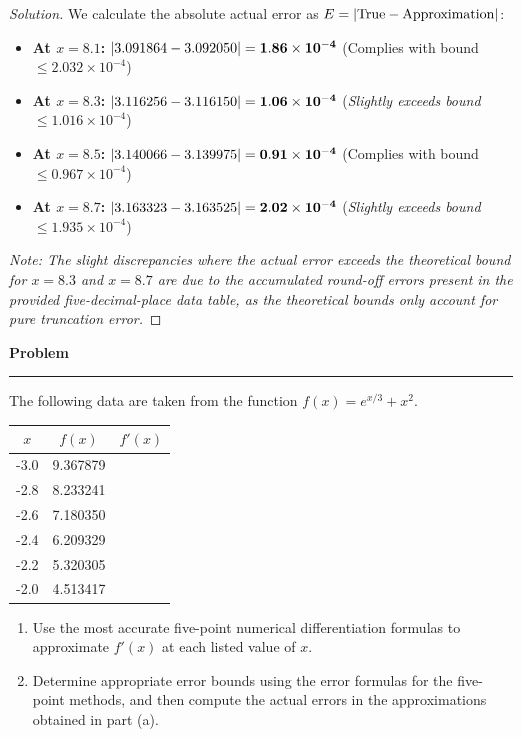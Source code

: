 \documentclass[11pt, a4paper]{article}
\DeclarePairedDelimiter\abs{\lvert}{\rvert}
\newenvironment{problem}{%
  \begin{tcolorbox}[
    colback=blue!4!white,
    colframe=blue!38!black,
    boxrule=0.95pt,
    arc=3pt,
    left=11pt,
    right=11pt,
    top=10pt,
    bottom=11pt,
    before skip=12pt,
    after skip=14pt,
  ]
  \noindent\textbf{\textcolor{blue!35!black}{Problem}}\par\nointerlineskip
  {\color{blue!42!black}\rule{\linewidth}{0.55pt}}\par\vspace{0.55em}%
}{%
  \end{tcolorbox}%
}
\newif\ifsolutionnewpage
\newenvironment{solution}
  {\begin{proof}[Solution]}
  {\end{proof}\ifsolutionnewpage\newpage\fi}
\begin{document}
\begin{solution}
    We calculate the absolute actual error as $E = \abs{\text{True} - \text{Approximation}}$:
    \begin{itemize}
        \item \textbf{At $x = 8.1$:} $\abs{3.091864 - 3.092050} = \mathbf{1.86 \times 10^{-4}}$ (Complies with bound $\le 2.032 \times 10^{-4}$)
        \item \textbf{At $x = 8.3$:} $\abs{3.116256 - 3.116150} = \mathbf{1.06 \times 10^{-4}}$ (\textit{Slightly exceeds bound $\le 1.016 \times 10^{-4}$})
        \item \textbf{At $x = 8.5$:} $\abs{3.140066 - 3.139975} = \mathbf{0.91 \times 10^{-4}}$ (Complies with bound $\le 0.967 \times 10^{-4}$)
        \item \textbf{At $x = 8.7$:} $\abs{3.163323 - 3.163525} = \mathbf{2.02 \times 10^{-4}}$ (\textit{Slightly exceeds bound $\le 1.935 \times 10^{-4}$})
    \end{itemize}
    
    \textit{Note: The slight discrepancies where the actual error exceeds the theoretical bound for $x=8.3$ and $x=8.7$ are due to the accumulated round-off errors present in the provided five-decimal-place data table, as the theoretical bounds only account for pure truncation error.}
    \end{solution}

    

\begin{problem}
    The following data are taken from the function $f(x) = e^{x/3} + x^2$.
    
    \begin{center}
    \begin{tabular}{c | c | c}
    $x$ & $f(x)$ & $f'(x)$ \\
    \hline
    -3.0 & 9.367879 & \\
    -2.8 & 8.233241 & \\
    -2.6 & 7.180350 & \\
    -2.4 & 6.209329 & \\
    -2.2 & 5.320305 & \\
    -2.0 & 4.513417 &
    \end{tabular}
    \end{center}
    
    \begin{enumerate}[label=(\alph*)]
        \item Use the most accurate five-point numerical differentiation formulas to approximate $f'(x)$ at each listed value of $x$.
        \item Determine appropriate error bounds using the error formulas for the five-point methods, and then compute the actual errors in the approximations obtained in part (a).
    \end{enumerate}
    \end{problem}
    
\end{document}
